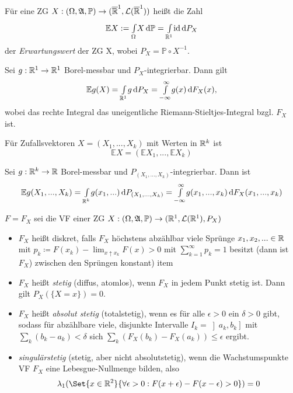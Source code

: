 \documentclass{cheat-sheet}
\newcommand{\Alg}{\mathfrak{A}}
\renewcommand{\P}{\mathbb{P}}
\newcommand{\E}{\mathbb{E}} %
\newcommand{\ER}{\overline\R} %
\newcommand{\Leb}{\mathcal{L}} %
\begin{document}
\begin{defn}
  Für eine ZG $X : (\Omega, \Alg, \P) \to (\ER^1, \Leb(\ER^1))$ heißt die Zahl
  \[ \E X := \Int{\Omega}{}{X}{\P} = \Int{\R^1}{}{\id}{P_X} \]
  der \emph{Erwartungswert} der ZG X, wobei $P_X = \P \circ X^{-1}$.
\end{defn}

\begin{kor}
  Sei $g : \mathbb{R}^1 \to \mathbb{R}^1$ Borel-messbar und $P_X$-integrierbar. Dann gilt
  \[ \E g(X) = \Int{\R^1}{}{g}{P_X} = \Int{- \infty}{\infty}{g(x)}{F_X(x)}, \]
  wobei das rechte Integral das uneigentliche Riemann-Stieltjes-Integral bzgl. $F_X$ ist.
\end{kor}

\begin{defn}
  Für Zufallsvektoren $X = (X_1, ..., X_k)$ mit Werten in $\mathbb{R}^k$ ist
  \[ \E X = (\E X_1, ..., \E X_k) \]
\end{defn}

Sei $g : \mathbb{R}^k \to \mathbb{R}$ Borel-messbar und $P_{(X_1, ..., X_k)}$-integrierbar. Dann ist
\[ \E g(X_1, ..., X_k) = \Int{\R^k}{}{g(x_1, ...)}{P_{(X_1, ..., X_k)}} = \Int{-\infty}{\infty}{g(x_1, ..., x_k)}{F_X(x_1, ..., x_k)} \]



$F = F_X$ sei die VF einer ZG $X : (\Omega, \Alg, \P) \to (\R^1, \Leb(\R^1), P_X)$

\begin{defn}
  \begin{itemize}
    \item $F_X$ heißt diskret, falls $F_X$ höchstens abzählbar viele Sprünge $x_1, x_2, ... \in \mathbb{R}$ mit $p_k \coloneqq F(x_k) - \lim_{x \uparrow x_k} F(x) > 0$ mit $\sum_{k=1}^\infty p_k = 1$ besitzt (dann ist $F_X$) zwischen den Sprüngen konstant)
    item 
    \item $F_X$ heißt \emph{stetig} (diffus, atomlos), wenn $F_X$ in jedem Punkt stetig ist. Dann gilt $P_X(\{ X = x \}) = 0$.
    \item $F_X$ heißt \emph{absolut stetig} (totalstetig), wenn es für alle $\epsilon > 0$ ein $\delta > 0$ gibt, sodass für abzählbare viele, disjunkte Intervalle $I_k = \left]a_k, b_k\right]$ mit $\sum_{k} (b_k - a_k) < \delta$ sich $\sum_{k} (F_X(b_k) - F_X(a_k)) \leq \epsilon$ ergibt.
    \item \emph{singulärstetig} (stetig, aber nicht absolutstetig), wenn die Wachstumspunkte VF $F_X$ eine Lebesgue-Nullmenge bilden, also
    \[ \lambda_1(\Set{ x \in \R^2 }{ \forall \epsilon > 0 : F(x+\epsilon)- F(x-\epsilon) > 0 }) = 0 \]
  \end{itemize}
\end{defn}
\end{document}
